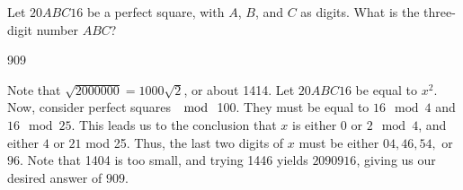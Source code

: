 \documentclass[11pt]{article}
\begin{document}
\begin{problem}
Let $20ABC16$ be a perfect square, with $A$, $B$, and $C$ as digits. What is the three-digit number $ABC$?
\end{problem}

\begin{answer}
909
\end{answer}

\begin{solution}    
Note that $\sqrt{2000000} = 1000\sqrt{2}$, or about 1414. Let $20ABC16$ be equal to $x^2$. Now, consider perfect squares $\mod$ 100. They must be equal to $16 \mod 4$ and $16 \mod 25$. This leads us to the conclusion that $x$ is either $0$  or $2 \mod 4$, and either $4$ or $21$ mod 25. Thus, the last two digits of $x$ must be either $04, 46, 54,$ or $96$. Note that 1404 is too small, and trying 1446 yields $2090916$, giving us our desired answer of $\boxed{909}$.
\end{solution}
\end{document}
